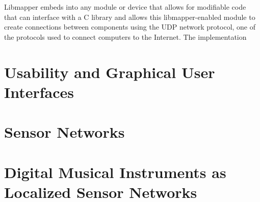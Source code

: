 Libmapper embeds into any module or device that allows for modifiable code that can interface with a C library and allows this libmapper-enabled module to create connections between components using the UDP network protocol, one of the protocols used to connect computers to the Internet. 
The implementation

\section{Usability and Graphical User Interfaces}

\section{Sensor Networks}

\section{Digital Musical Instruments as Localized Sensor Networks}
